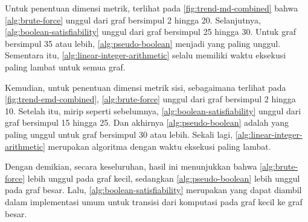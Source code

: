 Untuk penentuan dimensi metrik, terlihat pada \autoref{fig:trend-md-combined} bahwa \autoref{alg:brute-force} unggul dari graf bersimpul 2 hingga 20. Selanjutnya, \autoref{alg:boolean-satisfiability} unggul dari graf bersimpul 25 hingga 30. Untuk graf bersimpul 35 atau lebih, \autoref{alg:pseudo-boolean} menjadi yang paling unggul. Sementara itu, \autoref{alg:linear-integer-arithmetic} selalu memiliki waktu eksekusi paling lambat untuk semua graf.

Kemudian, untuk penentuan dimensi metrik sisi, sebagaimana terlihat pada \autoref{fig:trend-emd-combined}, \autoref{alg:brute-force} unggul dari graf bersimpul 2 hingga 10. Setelah itu, mirip seperti sebelumnya, \autoref{alg:boolean-satisfiability} unggul dari graf bersimpul 15 hingga 25. Dan akhirnya \autoref{alg:pseudo-boolean} adalah yang paling unggul untuk graf bersimpul 30 atau lebih. Sekali lagi, \autoref{alg:linear-integer-arithmetic} merupakan algoritma dengan waktu eksekusi paling lambat.

Dengan demikian, secara keseluruhan, hasil ini menunjukkan bahwa \autoref{alg:brute-force} lebih unggul pada graf kecil, sedangkan \autoref{alg:pseudo-boolean} lebih unggul pada graf besar. Lalu, \autoref{alg:boolean-satisfiability} merupakan  yang dapat diambil dalam implementasi umum untuk transisi dari komputasi pada graf kecil ke graf besar.

\begin{center}
	\renewcommand{\minipagewidth}{0.9\linewidth}

	

	\vspace{0.5em}

	
\end{center}
